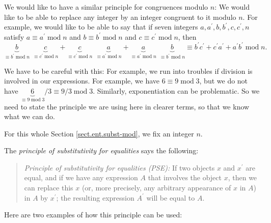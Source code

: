 \documentclass[numbers=enddot,12pt,final,onecolumn,notitlepage]{scrartcl}%
\numberwithin{exer}{subsection}
\theoremstyle{definition}
\newenvironment{statement}{\begin{quote}}{\end{quote}}
\begin{document}
We would like to have a similar principle for congruences modulo $n$: We would
like to be able to replace any integer by an integer congruent to it modulo
$n$. For example, we would like to be able to say that if seven integers
$a,a^{\prime},b,b^{\prime},c,c^{\prime},n$ satisfy $a\equiv a^{\prime
}\operatorname{mod}n$ and $b\equiv b^{\prime}\operatorname{mod}n$ and $c\equiv
c^{\prime}\operatorname{mod}n$, then%
\[
\underbrace{b}_{\equiv b^{\prime}\operatorname{mod}n}\ \ \underbrace{c}%
_{\equiv c^{\prime}\operatorname{mod}n}+\underbrace{c}_{\equiv c^{\prime
}\operatorname{mod}n}\ \ \underbrace{a}_{\equiv a^{\prime}\operatorname{mod}%
n}+\underbrace{a}_{\equiv a^{\prime}\operatorname{mod}n}\ \ \underbrace{b}%
_{\equiv b^{\prime}\operatorname{mod}n}\equiv b^{\prime}c^{\prime}+c^{\prime
}a^{\prime}+a^{\prime}b^{\prime}\operatorname{mod}n.
\]


We have to be careful with this: For example, we run into troubles if division
is involved in our expressions. For example, we have $6\equiv
9\operatorname{mod}3$, but we do not have $\underbrace{6}_{\equiv
9\operatorname{mod}3}/3\equiv9/3\operatorname{mod}3$. Similarly,
exponentiation can be problematic. So we need to state the principle we are
using here in clearer terms, so that we know what we can do.

For this whole Section \ref{sect.ent.subst-mod}, we fix an integer $n$.

The \textit{principle of substitutivity for equalities} says the following:

\begin{statement}
\textit{Principle of substitutivity for equalities (PSE):} If two objects $x$
and $x^{\prime}$ are equal, and if we have any expression $A$ that involves
the object $x$, then we can replace this $x$ (or, more precisely, any
arbitrary appearance of $x$ in $A$) in $A$ by $x^{\prime}$; the resulting
expression $A^{\prime}$ will be equal to $A$.
\end{statement}

Here are two examples of how this principle can be used:
\end{document}
